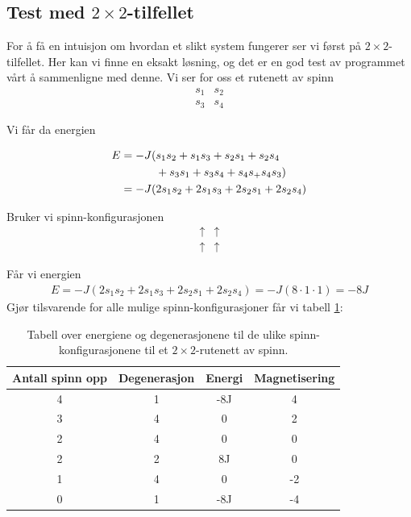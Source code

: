 \documentclass[11pt]{article}
\begin{document}
\subsection{Test med $2 \times 2$-tilfellet}
For å få en intuisjon om hvordan et slikt system fungerer ser vi først på 
$2 \times 2$-tilfellet. Her kan vi finne en eksakt løsning, og det er en god test
av programmet vårt å sammenligne med denne. Vi ser for oss et rutenett av spinn
\begin{align*}
s_1 & s_2 \\
s_3 & s_4  
\end{align*}

Vi får da energien

\begin{align*}
E &= -J ( s_1s_2 + s_1s_3 + s_2s_1 + s_2s_4 \\
&  \hspace{1.1cm}+ s_3s_1 + s_3s_4 + s_4s_ + s_4s_3) \\ 
&= - J  ( 2s_1s_2 + 2s_1s_3 + 2s_2s_1 + 2s_2s_4 ) 
\end{align*}

Bruker vi spinn-konfigurasjonen
\begin{align*}
\uparrow & \uparrow \\
\uparrow & \uparrow
\end{align*}

Får vi energien 
\begin{align*}
E = - J  ( 2s_1s_2 + 2s_1s_3 + 2s_2s_1 + 2s_2s_4 ) = -J ( 8 \cdot 1 \cdot 1) = -8J  
\end{align*}
Gjør tilsvarende for alle mulige spinn-konfigurasjoner får vi tabell \ref{tab:spinn-energi-deg}:


\begin{table}[ht]
\centering
\caption{Tabell over energiene og degenerasjonene til de ulike
  spinn-konfigurasjonene til et $2\times 2$-rutenett av spinn.}
\label{tab:spinn-energi-deg}
\vspace{0.5cm}
\begin{tabular}{cccc}
Antall spinn opp & Degenerasjon & Energi & Magnetisering \\
\hline
4 & 1 & -8J & 4 \\
3 & 4 & 0 & 2 \\
2 & 4 & 0 & 0 \\
2 & 2 & 8J & 0 \\
1 & 4 & 0 & -2 \\
0 & 1 & -8J & -4 \\
\hline
\end{tabular}
\end{table}
\end{document}
